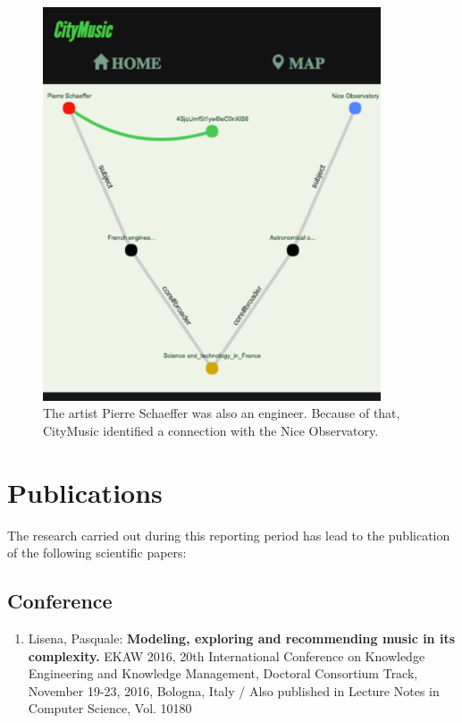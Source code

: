 \documentclass[a4paper,11pt]{report}
\begin{document}
\begin{figure}
 \centerline{
 \includegraphics[width=10cm]{citymusic.png}}
 \caption{The artist Pierre Schaeffer was also an engineer. Because of that, CityMusic identified a connection with the Nice Observatory.}
 \label{fig:citymusic}
\end{figure}


\chapter*{Publications}
\label{sec:publications}
\ifpdf
    \graphicspath{{Chapter2/Chapter2Figs/PNG/}{Chapter2/Chapter2Figs/PDF/}{Chapter2/Chapter2Figs/}}
\else
    \graphicspath{{Chapter2/Chapter2Figs/EPS/}{Chapter2/Chapter2Figs/}}
\fi

The research carried out during this reporting period has lead to the publication of the following scientific papers:

\section*{Conference}
\begin{enumerate}
\setcounter{enumi}{0}

\item Lisena, Pasquale:
\textbf{Modeling, exploring and recommending music in its complexity.}
EKAW 2016, 20th International Conference on Knowledge Engineering and Knowledge Management, Doctoral Consortium Track, November 19-23, 2016, Bologna, Italy / Also published in Lecture Notes in Computer Science, Vol. 10180

\end{enumerate}
\end{document}
